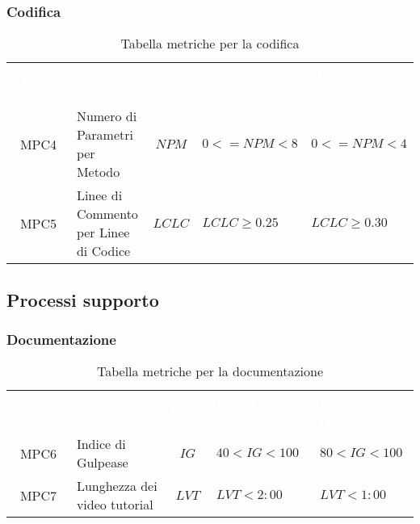 \subsubsection{Codifica}
     \renewcommand{\arraystretch}{1.5}
     \begin{longtable}{ c C{4cm} c C{3.5cm} C{3.5cm}}
     	\caption{Tabella metriche per la codifica}\\
     	\textcolor{white}{\textbf{Metrica}} & \textcolor{white}{\textbf{Nome}} & \textcolor{white}{\textbf{Sigla}} & \textcolor{white}{\textbf{Range Accettabile}} & \textcolor{white}{\textbf{Range Ottimale}}\\
		MPC4 & Numero di Parametri per Metodo & $NPM$ & $0 <= NPM < 8$ & $ 0 <= NPM < 4$ \\
		MPC5 & Linee di Commento per Linee di Codice & $LCLC$ & $LCLC \geq 0.25$ & $LCLC \geq 0.30$ \\
	\end{longtable}

\newpage
\subsection{Processi supporto}

\subsubsection{Documentazione}
    \renewcommand{\arraystretch}{1.5}
    \begin{longtable}{ c C{4cm} c C{3.5cm} C{3.5cm}}
    	\caption{Tabella metriche per la documentazione}\\
    	\textcolor{white}{\textbf{Metrica}} & \textcolor{white}{\textbf{Nome}} & \textcolor{white}{\textbf{Sigla}} & \textcolor{white}{\textbf{Range Accettabile}} & \textcolor{white}{\textbf{Range Ottimale}}\\
		MPC6 & Indice di Gulpease & $IG$ & $40 < IG < 100$ & $80 < IG < 100$ \\
		MPC7 & Lunghezza dei video tutorial & $LVT$ & $LVT < 2:00$ & $LVT < 1:00$ \\
    \end{longtable}
\vspace{0.3cm}
